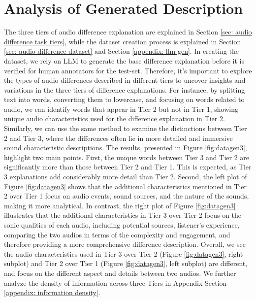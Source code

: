 \section{Analysis of Generated Description} \label{appendix: reviewer analysis}
The three tiers of audio difference explanation are explained in Section \ref{sec: audio difference task tiers}, while the dataset creation process is explained in Section \ref{sec: audio difference dataset} and Section \ref{appendix: llm gen}. In creating the dataset, we rely on LLM to generate the base difference explanation before it is verified for human annotators for the test-set. Therefore, it's important to explore the types of audio differences described in different tiers to uncover insights and variations in the three tiers of difference explanations. For instance, by splitting text into words, converting them to lowercase, and focusing on words related to audio, we can identify words that appear in Tier 2 but not in Tier 1, showing unique audio characteristics used for the difference explanation in Tier 2. Similarly, we can use the same method to examine the distinctions between Tier 2 and Tier 3, where the differences often lie in more detailed and immersive sound characteristic descriptions. The results, presented in Figure \ref{fig:datagen3}, highlight two main points. First, the unique words between Tier 3 and Tier 2 are significantly more than those between Tier 2 and Tier 1. This is expected, as Tier 3 explanations add considerably more detail than Tier 2. Second, the left plot of Figure \ref{fig:datagen3} shows that the additional characteristics mentioned in Tier 2 over Tier 1 focus on audio events, sound sources, and the nature of the sounds, making it more analytical. In contrast, the right plot of Figure \ref{fig:datagen3} illustrates that the additional characteristics in Tier 3 over Tier 2 focus on the sonic qualities of each audio, including potential sources, listener’s experience, comparing the two audios in terms of the complexity and engagement, and therefore providing a more comprehensive difference description. Overall, we see the audio characteristics used in Tier 3 over Tier 2 (Figure \ref{fig:datagen3}, right subplot)  and Tier 2 over Tier 1 (Figure \ref{fig:datagen3}, left subplot) are different, and focus on the different aspect and details between two audios. We further analyze the density of information across three Tiers in Appendix Section \ref{appendix: information density}. 

